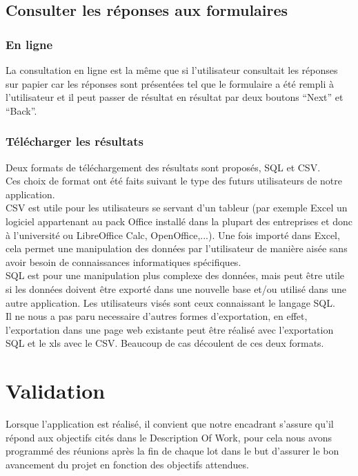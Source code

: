 \documentclass{sigplanconf}
\begin{document}
\subsection{Consulter les réponses aux formulaires}
\subsubsection{En ligne}
La consultation en ligne est la même que si l'utilisateur consultait les réponses sur papier car les réponses sont présentées tel que le formulaire a été rempli à l'utilisateur et il peut passer de résultat en résultat par deux boutons ``Next'' et ``Back''.

\subsubsection{Télécharger les résultats}
Deux formats de téléchargement des résultats sont proposés, SQL et CSV.\\
Ces choix de format ont été faits suivant le type des futurs utilisateurs de notre application.\\
CSV est utile pour les utilisateurs se servant d'un tableur (par exemple Excel un logiciel appartenant au pack Office installé dans la plupart des entreprises et donc à l'université ou LibreOffice Calc, OpenOffice,...). Une fois importé dans Excel, cela permet une manipulation des données par l'utilisateur de manière aisée sans avoir besoin de connaissances informatiques spécifiques.\\
SQL est pour une manipulation plus complexe des données, mais peut être utile si les données doivent être exporté dans une nouvelle base et/ou utilisé dans une autre application. Les utilisateurs visés sont ceux connaissant le langage SQL.\\
Il ne nous a pas paru necessaire d'autres formes d'exportation, en effet, l'exportation dans une page web existante peut être réalisé avec l'exportation SQL et le xls avec le CSV. Beaucoup de cas découlent de ces deux formats.

\section{Validation}
Lorsque l'application est réalisé, il convient que notre encadrant s'assure qu'il répond aux objectifs cités dans le Description Of Work, pour cela nous avons programmé des réunions après la fin de chaque lot dans le but d’assurer le bon avancement du projet en fonction des objectifs attendues.
\end{document}
